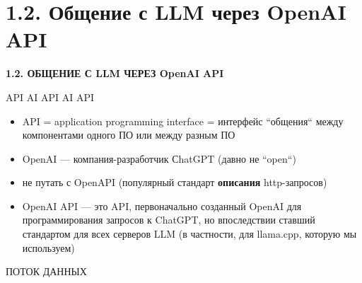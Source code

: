 \documentclass[aspectratio=169]{beamer}
\begin{document}
    \section{1.2. Общение с LLM через OpenAI API}
    {
    	\begin{frame}
    		\centering
    		\vspace{2cm}
    		{\huge\headerfont\bfseries 1.2. ОБЩЕНИЕ С LLM ЧЕРЕЗ OpenAI API}
    	\end{frame}
    
    \begin{frame}{API AI API AI API}
    	\begin{itemize}
    		\item [-] API = application programming interface = интерфейс ``общения`` между компонентами одного ПО или между разным ПО 
    		\item [-] OpenAI --- компания-разработчик СhatGPT (давно не ``open``)
    		\item [-] не путать с OpenAPI (популярный стандарт {\bf описания} http-запросов)
    		\item [-] OpenAI API --- это API, первоначально созданный OpenAI для программирования запросов к ChatGPT, но впоследствии ставший стандартом для всех серверов LLM (в частности, для llama.cpp, которую мы используем)
    	\end{itemize}
    \end{frame}
    
    \begin{frame}{ПОТОК ДАННЫХ}
    	
    	\centering
\end{frame}}
\end{document}
